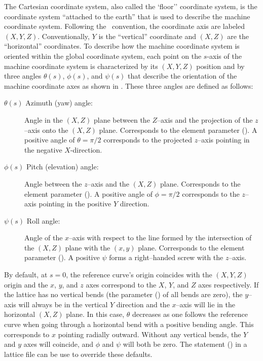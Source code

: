 The Cartesian  coordinate system, also called the `floor'' coordinate system, is the
coordinate system ``attached to the earth'' that is used to describe the machine coordinate
system. Following the \mad\ convention, the  coordinate axis are labeled $(X, Y,
Z)$. Conventionally, $Y$ is the ``vertical'' coordinate and $(X, Z)$ are the ``horizontal''
coordinates. To describe how the machine coordinate system is oriented within the global coordinate
system, each point on the $s$-axis of the machine coordinate system is characterized by its $(X, Y,
Z)$ position and by three angles $\theta(s)$, $\phi(s)$, and $\psi(s)$ that describe the orientation
of the machine coordinate axes as shown in . These three angles are defined as
follows:
\begin{description}
%
\item[$\theta(s)$ Azimuth (yaw) angle:] 
Angle in the $(X, Z)$ plane between the $Z$--axis and the projection of the $z$--axis onto the $(X,
Z)$ plane. Corresponds to the  element parameter (). A positive angle of
$\theta = \pi/2$ corresponds to the projected $z$--axis pointing in the negative $X$-direction.
%
\item[$\phi(s)$ Pitch (elevation) angle:] 
Angle between the $z$--axis and the $(X,Z)$ plane. Corresponds to the  element parameter
(). A positive angle of $\phi = \pi/2$ corresponds to the $z$--axis pointing in the
positive $Y$ direction.
%
\item[$\psi(s)$ Roll angle:] 
Angle of the $x$--axis with respect to the line formed by the intersection of the $(X, Z)$ plane
with the $(x, y)$ plane. Corresponds to the  element parameter (). A
positive $\psi$ forms a right--handed screw with the $z$--axis.
\end{description}

By default, at $s = 0$, the reference curve's origin coincides with the $(X, Y, Z)$ origin and the
$x$, $y$, and $z$ axes correspond to the $X$, $Y$, and $Z$ axes respectively. If the lattice has no
vertical bends (the  parameter () of all bends are zero), the $y$--axis
will always be in the vertical $Y$ direction and the $x$--axis will lie in the horizontal $(X,Z)$
plane. In this case, $\theta$ decreases as one follows the reference curve when going through a
horizontal bend with a positive bending angle. This corresponds to $x$ pointing radially
outward. Without any vertical bends, the $Y$ and $y$ axes will coincide, and $\phi$ and $\psi$ will
both be zero. The  statement () in a lattice file can be use to
override these defaults.

